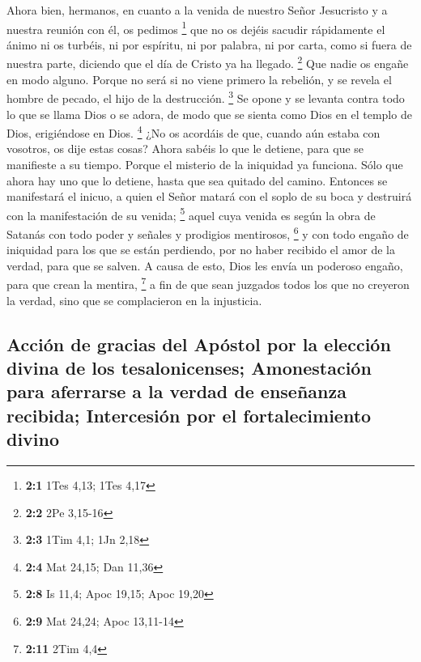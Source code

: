  Ahora bien, hermanos, en cuanto a la venida de nuestro
Señor Jesucristo y a nuestra reunión con él, os pedimos \footnote{\textbf{2:1}
  1Tes 4,13; 1Tes 4,17}  que no os dejéis sacudir
rápidamente el ánimo ni os turbéis, ni por espíritu, ni por palabra, ni
por carta, como si fuera de nuestra parte, diciendo que el día de Cristo
ya ha llegado. \footnote{\textbf{2:2} 2Pe 3,15-16}  Que
nadie os engañe en modo alguno. Porque no será si no viene primero la
rebelión, y se revela el hombre de pecado, el hijo de la destrucción.
\footnote{\textbf{2:3} 1Tim 4,1; 1Jn 2,18}  Se opone y se
levanta contra todo lo que se llama Dios o se adora, de modo que se
sienta como Dios en el templo de Dios, erigiéndose en Dios. \footnote{\textbf{2:4}
  Mat 24,15; Dan 11,36}  ¿No os acordáis de que, cuando
aún estaba con vosotros, os dije estas cosas?  Ahora
sabéis lo que le detiene, para que se manifieste a su tiempo.
 Porque el misterio de la iniquidad ya funciona. Sólo que
ahora hay uno que lo detiene, hasta que sea quitado del camino.
 Entonces se manifestará el inicuo, a quien el Señor
matará con el soplo de su boca y destruirá con la manifestación de su
venida; \footnote{\textbf{2:8} Is 11,4; Apoc 19,15; Apoc 19,20}
 aquel cuya venida es según la obra de Satanás con todo
poder y señales y prodigios mentirosos, \footnote{\textbf{2:9} Mat
  24,24; Apoc 13,11-14}  y con todo engaño de iniquidad
para los que se están perdiendo, por no haber recibido el amor de la
verdad, para que se salven.  A causa de esto, Dios les
envía un poderoso engaño, para que crean la mentira, \footnote{\textbf{2:11}
  2Tim 4,4}  a fin de que sean juzgados todos los que no
creyeron la verdad, sino que se complacieron en la injusticia.

\hypertarget{acciuxf3n-de-gracias-del-apuxf3stol-por-la-elecciuxf3n-divina-de-los-tesalonicenses-amonestaciuxf3n-para-aferrarse-a-la-verdad-de-enseuxf1anza-recibida-intercesiuxf3n-por-el-fortalecimiento-divino}{%
\subsection{Acción de gracias del Apóstol por la elección divina de los
tesalonicenses; Amonestación para aferrarse a la verdad de enseñanza
recibida; Intercesión por el fortalecimiento
divino}\label{acciuxf3n-de-gracias-del-apuxf3stol-por-la-elecciuxf3n-divina-de-los-tesalonicenses-amonestaciuxf3n-para-aferrarse-a-la-verdad-de-enseuxf1anza-recibida-intercesiuxf3n-por-el-fortalecimiento-divino}}

